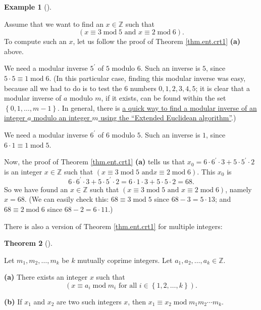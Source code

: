 \documentclass[numbers=enddot,12pt,final,onecolumn,notitlepage]{scrartcl}%
\numberwithin{exer}{subsection}
\theoremstyle{definition}
\newtheorem{theo}{Theorem}[subsection]
\newenvironment{theorem}[1][]
{\begin{theo}[#1]\begin{leftbar}}
{\end{leftbar}\end{theo}}
\newtheorem{exam}[theo]{Example}
\newenvironment{example}[1][]
{\begin{exam}[#1]\begin{leftbar}}
{\end{leftbar}\end{exam}}
\begin{document}
\begin{example}
Assume that we want to find an $x\in\mathbb{Z}$ such that%
\[
\left(  x\equiv3\operatorname{mod}5\text{ and }x\equiv2\operatorname{mod}%
6\right)  .
\]
To compute such an $x$, let us follow the proof of Theorem \ref{thm.ent.crt1}
\textbf{(a)} above.

We need a modular inverse $5^{\prime}$ of $5$ modulo $6$. Such an inverse is
$5$, since $5\cdot5\equiv1\operatorname{mod}6$. (In this particular case,
finding this modular inverse was easy, because all we had to do is to test the
$6$ numbers $0,1,2,3,4,5$; it is clear that a modular inverse of $a$ modulo
$m$, if it exists, can be found within the set $\left\{  0,1,\ldots
,m-1\right\}  $. In general, there is
\href{https://en.wikipedia.org/wiki/Modular_multiplicative_inverse#Computation}{a
quick way to find a modular inverse of an integer $a$ modulo an integer $m$
using the \textquotedblleft Extended Euclidean algorithm\textquotedblright}.)

We need a modular inverse $6^{\prime}$ of $6$ modulo $5$. Such an inverse is
$1$, since $6\cdot1\equiv1\operatorname{mod}5$.

Now, the proof of Theorem \ref{thm.ent.crt1} \textbf{(a)} tells us that
$x_{0}=6\cdot6^{\prime}\cdot3+5\cdot5^{\prime}\cdot2$ is an integer
$x\in\mathbb{Z}$ such that $\left(  x\equiv3\operatorname{mod}5\text{ and
}x\equiv2\operatorname{mod}6\right)  $. This $x_{0}$ is%
\[
6\cdot6^{\prime}\cdot3+5\cdot5^{\prime}\cdot2=6\cdot1\cdot3+5\cdot5\cdot2=68.
\]
So we have found an $x\in\mathbb{Z}$ such that $\left(  x\equiv
3\operatorname{mod}5\text{ and }x\equiv2\operatorname{mod}6\right)  $, namely
$x=68$. (We can easily check this: $68\equiv3\operatorname{mod}5$ since
$68-3=5\cdot13$; and $68\equiv2\operatorname{mod}6$ since $68-2=6\cdot11$.)
\end{example}

There is also a version of Theorem \ref{thm.ent.crt1} for multiple integers:

\begin{theorem}
\label{thm.ent.crt1k}Let $m_{1},m_{2},\ldots,m_{k}$ be $k$ mutually coprime
integers. Let $a_{1},a_{2},\ldots,a_{k}\in\mathbb{Z}$.

\textbf{(a)} There exists an integer $x$ such that
\begin{equation}
\left(  x\equiv a_{i}\operatorname{mod}m_{i}\text{ for all }i\in\left\{
1,2,\ldots,k\right\}  \right)  . \label{eq.thm.ent.crt1k.1}%
\end{equation}


\textbf{(b)} If $x_{1}$ and $x_{2}$ are two such integers $x$, then
$x_{1}\equiv x_{2}\operatorname{mod}m_{1}m_{2}\cdots m_{k}$.
\end{theorem}
\end{document}
